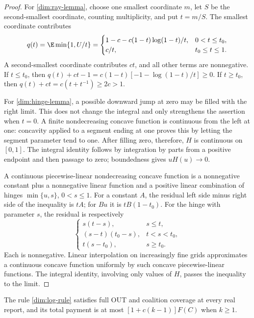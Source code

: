 \begin{proof}
For \eqref{dim:ray-lemma}, choose one smallest coordinate $m$, let $S$
be the second-smallest coordinate, counting multiplicity, and put $t=m/S$.
The smallest coordinate contributes
\[
 q(t)=\E\min\{1,U/t\}
 =\begin{cases}
 1-c-c(1-t)\log(1-t)/t,&0<t\le t_0,\\
 c/t,&t_0\le t\le1.
 \end{cases}
\]
A second-smallest coordinate contributes $ct$, and all other terms are
nonnegative. If $t\le t_0$, then
$q(t)+ct-1=c(1-t)[-1-\log(1-t)/t]\ge0$.
If $t\ge t_0$, then $q(t)+ct=c(t+t^{-1})\ge2c>1$.

For \eqref{dim:hinge-lemma}, a possible downward jump at zero may be
filled with the right limit. This does not change the integral and only
strengthens the assertion when $t=0$. A finite nondecreasing concave
function is continuous from the left at one: concavity applied to a segment
ending at one proves this by letting the segment parameter tend to one.
After filling zero, therefore, $H$ is continuous on $[0,1]$.
The integral identity follows by integration by parts from a positive
endpoint and then passage to zero; boundedness gives $uH(u)\to0$.

A continuous piecewise-linear nondecreasing concave function is a
nonnegative constant plus a nonnegative linear function and a positive
linear combination of hinges $\min\{u,s\}$, $0<s\le1$.
For a constant $A$, the residual left side minus right side of the
inequality is $tA$; for $Bu$ it is $tB(1-t_0)$.
For the hinge with parameter $s$, the residual is respectively
\[
 \begin{cases}
 s(t-s),&s\le t,\\
 (s-t)(t_0-s),&t<s<t_0,\\
 t(s-t_0),&s\ge t_0.
 \end{cases}
\]
Each is nonnegative. Linear interpolation on increasingly fine grids
approximates a continuous concave function uniformly by such concave
piecewise-linear functions. The integral identity, involving only values
of $H$, passes the inequality to the limit.
\end{proof}

\begin{proposition}\label{dim:out-upper}
The rule \eqref{dim:log-rule} satisfies full OUT and coalition coverage at
every real report, and its total payment is at most
$[1+c(k-1)]F(C)$ when $k\ge1$.
\end{proposition}

